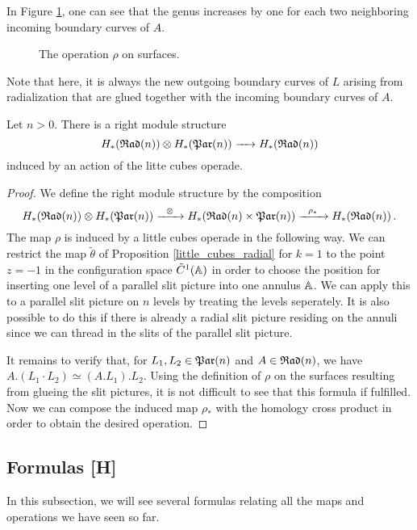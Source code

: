 In Figure \ref{rad_is_par_module}, one can see that the genus increases by one for each two neighboring incoming boundary curves of $A$.
\begin{figure}[ht]
\centering
\def\svgwidth{\columnwidth}

\caption{\label{rad_is_par_module} The operation $\rho$ on surfaces.}
\end{figure}
Note that here, it is always the new outgoing boundary curves of $L$ arising from radialization that are glued together with the incoming boundary curves of $A$.

\begin{prop}
   Let $n > 0$.
   There is a right module structure 
   \[
      H_*(\mathfrak{Rad}(n)) \otimes H_*(\mathfrak{Par}(n)) \xrightarrow{\hspace{6pt}{}\hspace{6pt}} H_*(\mathfrak{Rad}(n))
   \]
   induced by an action of the litte cubes operade.
\begin{proof}
   We define the right module structure by the composition
   \[
      H_*(\mathfrak{Rad}(n)) \otimes H_*(\mathfrak{Par}(n)) \xrightarrow{\hspace{6pt}{\otimes}\hspace{6pt}} H_*(\mathfrak{Rad}(n) \times \mathfrak{Par}(n)) \xrightarrow{\hspace{6pt}{\rho_*}\hspace{6pt}} H_*(\mathfrak{Rad}(n))\,.
   \]
   The map $\rho$ is induced by a little cubes operade in the following way.
   We can restrict the map $\tilde \theta$ of Proposition \ref{little_cubes_radial} for $k = 1$ to the point $z = -1$ in the configuration space $\tilde C^1(\mathbb A)$ in order to choose
   the position for inserting one level of a parallel slit picture into one annulus $\mathbb A$.
   We can apply this to a parallel slit picture on $n$ levels by treating the levels seperately.
   It is also possible to do this if there is already a radial slit picture residing on the annuli since we can thread in the slits of the parallel slit picture.
   
   It remains to verify that, for $L_1, L_2 \in \mathfrak{Par}(n)$ and $A \in \mathfrak{Rad}(n)$, we have $A.(L_1 \cdot L_2) \simeq (A.L_1).L_2$.
   Using the definition of $\rho$ on the surfaces resulting from glueing the slit pictures, it is not difficult to see that this formula if fulfilled.
   Now we can compose the induced map $\rho_*$ with the homology cross product in order to obtain the desired operation.
\end{proof}
\end{prop}

\subsection{Formulas [H]}

In this subsection, we will see several formulas relating all the maps and operations we have seen so far.

